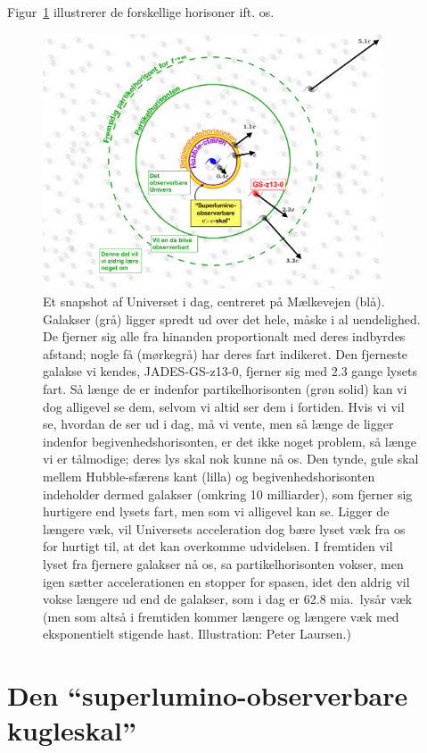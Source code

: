 \documentclass[useAMS,danish]{aa}
\begin{document}
Figur~\ref{fig:horizons} illustrerer de forskellige horisoner ift. os.
\begin{figure}[!t]
    \centering
    \includegraphics [width=0.90\textwidth] {./horizons.pdf}
    \caption{\small{
        Et snapshot af Universet i dag, centreret på Mælkevejen (blå).
        Galakser (grå) ligger spredt ud over det hele, måske i al uendelighed.
        De fjerner sig alle fra hinanden proportionalt med deres indbyrdes afstand; nogle få (mørkegrå) har deres fart indikeret.
        Den fjerneste galakse vi kendes, JADES-GS-z13-0, fjerner sig med 2.3 gange lysets fart.
        Så længe de er indenfor partikelhorisonten (grøn solid) kan vi dog alligevel se dem, selvom vi altid ser dem i fortiden.
        Hvis vi vil se, hvordan de ser ud i dag, må vi vente, men så længe de ligger indenfor begivenhedshorisonten, er det ikke noget problem, så længe vi er tålmodige; deres lys skal nok kunne nå os.
        Den tynde, gule skal mellem Hubble-sfærens kant (lilla) og begivenhedshorisonten indeholder dermed galakser (omkring 10 milliarder), som fjerner sig hurtigere end lysets fart, men som vi alligevel kan se.
        Ligger de længere væk, vil Universets acceleration dog bære lyset væk fra os for hurtigt til, at det kan overkomme udvidelsen.
        I fremtiden vil lyset fra fjernere galakser nå os, sa partikelhorisonten vokser, men igen sætter accelerationen en stopper for spasen, idet den aldrig vil vokse længere ud end de galakser, som i dag er 62.8 mia.~lysår væk (men som altså i fremtiden kommer længere og længere væk med eksponentielt stigende hast. Illustration: Peter Laursen.)
    }}
    \label{fig:horizons}
\end{figure}
\section{Den ``superlumino-observerbare kugleskal''}
\label{sec:obsskal}
\end{document}
